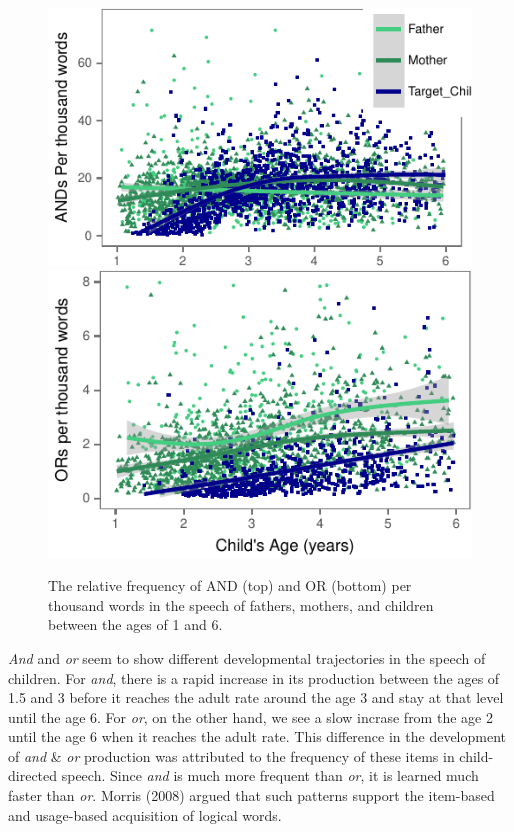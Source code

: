 \documentclass[10pt, letterpaper]{article}
\newenvironment{CodeChunk}{}{}
\begin{document}
\begin{CodeChunk}
\begin{figure}[H]
\includegraphics{figs/OverallConnectivePlots-1} \includegraphics{figs/OverallConnectivePlots-2} \caption[The relative frequency of AND (top) and OR (bottom) per thousand words in the speech of fathers, mothers, and children between the ages of 1 and 6]{The relative frequency of AND (top) and OR (bottom) per thousand words in the speech of fathers, mothers, and children between the ages of 1 and 6.}\label{fig:OverallConnectivePlots}
\end{figure}
\end{CodeChunk}

\emph{And} and \emph{or} seem to show different developmental
trajectories in the speech of children. For \emph{and}, there is a rapid
increase in its production between the ages of 1.5 and 3 before it
reaches the adult rate around the age 3 and stay at that level until the
age 6. For \emph{or}, on the other hand, we see a slow incrase from the
age 2 until the age 6 when it reaches the adult rate. This difference in
the development of \emph{and} \& \emph{or} production was attributed to
the frequency of these items in child-directed speech. Since \emph{and}
is much more frequent than \emph{or}, it is learned much faster than
\emph{or}. Morris (2008) argued that such patterns support the
item-based and usage-based acquisition of logical words.
\end{document}
